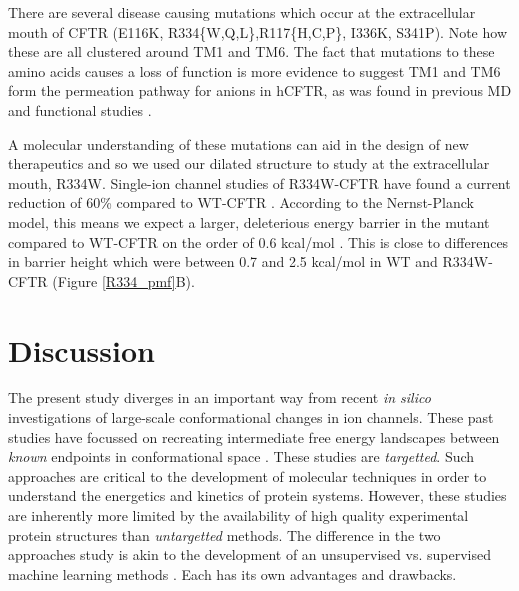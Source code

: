 There are several disease causing mutations which occur at the extracellular mouth of CFTR (E116K, R334\{W,Q,L\},R117\{H,C,P\}, I336K, S341P)\cite{cftr2}. Note how these are all clustered around TM1 and TM6. The fact that mutations to these amino acids causes a loss of function is more evidence to suggest TM1 and TM6 form the permeation pathway for anions in hCFTR, as was found in previous MD and functional studies \cite{zeng2021,farkas2020, linsdell2016, linsdell2018}. 

A molecular understanding of these mutations can aid in the design of new therapeutics and so we used our dilated structure to study at the extracellular mouth, R334W. Single-ion channel studies of R334W-CFTR have found a current reduction of 60\% compared to WT-CFTR \cite{gong2004}. According to the Nernst-Planck model, this means we expect a larger, deleterious energy barrier in the mutant compared to WT-CFTR on the order of 0.6 kcal/mol \cite{kuyucak2001}. This is close to differences in barrier height which were between 0.7 and 2.5 kcal/mol in WT and R334W-CFTR (Figure \ref{R334_pmf}B). 

\section{Discussion}

The present study diverges in an important way from recent \textit{in silico} investigations of large-scale conformational changes in ion channels. These past studies have focussed on recreating intermediate free energy landscapes between \textit{known} endpoints in conformational space \cite{lev2020, bergh2021, moradi2015}. These studies are \textit{targetted}. Such approaches are critical to the development of molecular techniques in order to understand the energetics and kinetics of protein systems. However, these studies are inherently more limited by the availability of high quality experimental protein structures than \textit{untargetted} methods. The difference in the two approaches study is akin to the development of an unsupervised vs. supervised machine learning methods \cite{grus2015, friedman2017}. Each has its own advantages and drawbacks.


